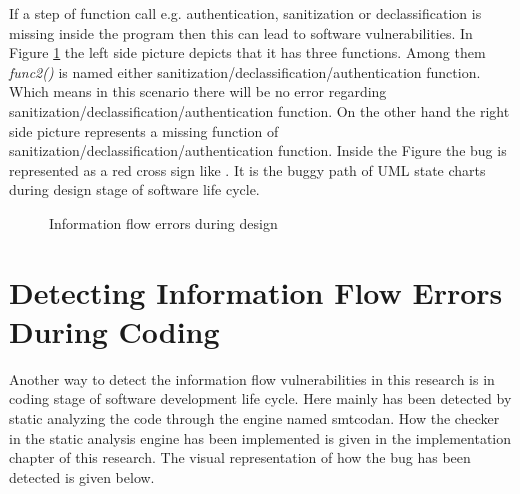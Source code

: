 If a step of function call e.g. authentication, sanitization or declassification is missing inside the program then this can lead to software vulnerabilities. In Figure \ref{figure_FunctionCallMissing} the left side picture depicts that it has three functions. Among them \emph{func2()} is named either sanitization/declassification/authentication function. Which means in this scenario there will be no error regarding sanitization/declassification/authentication function. On the other hand the right side picture represents a missing function of sanitization/declassification/authentication function. Inside the Figure the bug is represented as a red cross sign like . It is the buggy path of UML state charts during design stage of software life cycle. 
\begin{figure}[htbp]
	\centering
	\vspace{-1em}
	\caption{Information flow errors during design}
	\label{figure_FunctionCallMissing}
\end{figure}


\section{ Detecting Information Flow Errors During Coding}

Another way to detect the information flow vulnerabilities in this research is in coding stage of software development life cycle. Here mainly has been detected by static analyzing the code through the engine named smtcodan. How the checker in the static analysis engine has been implemented is given in the implementation chapter of this research. The visual representation of how the bug has been detected is given below.

